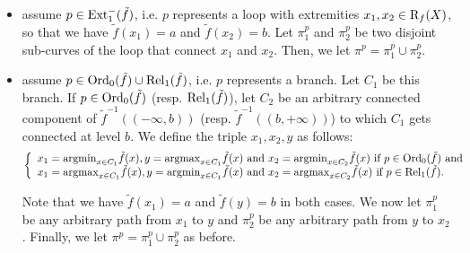 \begin{itemize}

\item assume $p\in\mathrm{Ext}_1^-(\tilde f)$, i.e. $p$ represents a loop 
with extremities $x_1,x_2\in\mathrm{R}_f(X)$, so that we have $\tilde f(x_1)=a$ and $\tilde f(x_2)=b$.
Let $\pi_1^p$ and $\pi_2^p$ be two disjoint sub-curves of the loop that connect $x_1$ and $x_2$.
Then, we let $\pi^p=\pi_1^p\cup\pi_2^p$.


\item assume $p\in\mathrm{Ord}_0(\tilde f)\cup \mathrm{Rel}_1(\tilde f)$, i.e. $p$ represents a branch.
Let $C_1$ be this branch. If $p\in\mathrm{Ord}_0(\tilde f)$ (resp. $\mathrm{Rel}_1(\tilde f)$), let $C_2$ be an arbitrary connected component of 
$\tilde f^{-1}((-\infty,b))$ (resp. $\tilde f^{-1}((b,+\infty))$)
to which $C_1$ gets connected at level $b$. We define the triple $x_1,x_2,y$ as follows:
$$
\left\{\begin{array}{l} 
x_1={\rm argmin}_{x\in C_1}\tilde f(x),y={\rm argmax}_{x\in C_1}\tilde f(x)\text{ and }x_2= {\rm argmin}_{x\in C_2}\tilde f(x)\text{ if }p\in\mathrm{Ord}_0(\tilde f)\text{ and } \\ 
x_1={\rm argmax}_{x\in C_1}\tilde f(x),y={\rm argmin}_{x\in C_1}\tilde f(x)\text{ and }x_2= {\rm argmax}_{x\in C_2}\tilde f(x)\text{ if }p\in\mathrm{Rel}_1(\tilde f).
\end{array}\right.$$ 
 
Note that we have $\tilde f(x_1)=a$ and $\tilde f(y)=b$ in both cases.
We now let $\pi_1^p$ be any arbitrary path from $x_1$ to $y$ and  $\pi_2^p$ be any arbitrary path from $y$ to $x_2$.
Finally, we let $\pi^p=\pi_1^p\cup\pi_2^p$ as before.

\end{itemize}

